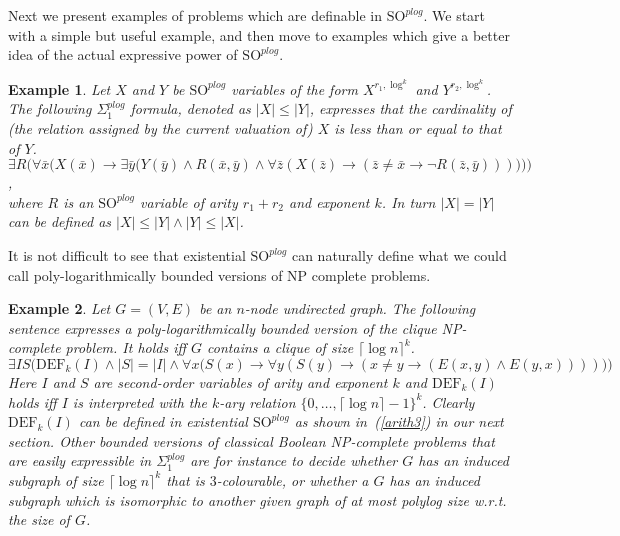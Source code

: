 \documentclass{article}
\newtheorem{example}{Example}
\begin{document}
Next we present examples of problems which are definable in $\mathrm{SO}^{\mathit{plog}}$. We start with a simple but useful example, and then move to examples which give a better idea of the actual expressive power of $\mathrm{SO}^{\mathit{plog}}$.

\begin{example}
Let $X$ and $Y$ be $\mathrm{SO}^{\mathit{plog}}$ variables of the form $X^{r_1,\log^{k}}$ and $Y^{r_2,\log^{k}}$. The following $\Sigma^{\mathit{plog}}_1$ formula, denoted as $|X| \leq |Y|$, expresses that the cardinality of (the relation assigned by the current valuation of) $X$ is less than or equal to that of $Y$. \\[0.1cm]
\hspace*{0.38cm}$\exists R \Big(\forall \bar{x} \big(X(\bar{x}) \to \exists \bar{y} \big( Y(\bar{y})\wedge R(\bar{x},\bar{y}) \wedge \forall \bar{z} (X(\bar{z})\to (\bar{z}{\neq} \bar{x} \to \neg R(\bar{z},\bar{y})))\big)\big)\Big)$,\\[0.1cm]
where $R$ is an $\mathrm{SO}^{\mathit{plog}}$ variable of arity $r_1+r_2$ and exponent $k$. In turn $|X|{=}|Y|$ can be defined as $|X|{\leq}|Y| \wedge |Y|{\leq}|X|$.
\end{example}

It is not difficult to see that existential $\mathrm{SO}^{\mathit{plog}}$ can naturally define what we could call poly-logarithmically bounded versions of NP complete problems.

\begin{example}\label{polylogclique}
Let $G=(V,E)$ be an $n$-node undirected graph. The following sentence expresses a poly-logarithmically bounded version of the clique NP-complete problem. It holds iff $G$ contains a clique of size $\lceil \log n\rceil^k$. 
\[\exists I S \big(\mathrm{DEF}_k(I) \wedge |S|{=}|I| \wedge\forall x \big(S(x) {\to} \forall y (S(y) \to (x\neq y \to (E(x,y) \wedge E(y,x))))\big)\big)\]
Here $I$ and $S$ are second-order variables of arity and exponent $k$ and $\mathrm{DEF}_k(I)$ holds iff $I$ is interpreted with the $k$-ary relation $\{0, \ldots, \lceil \log n \rceil -1\}^k$. Clearly $\mathrm{DEF}_k(I)$ can be defined in existential $\mathrm{SO}^{\mathit{plog}}$ as shown in~(\ref{arith3}) in our next section. 
Other bounded versions of classical Boolean NP-complete problems that are easily expressible in $\Sigma^{\mathit{plog}}_1$ are for instance to decide whether $G$ has an induced subgraph of size $\lceil \log n \rceil^k$ that is $3$-colourable, or whether a $G$ has an induced subgraph which is isomorphic to another given graph of at most polylog size w.r.t. the size of $G$.
\end{example}
\end{document}
